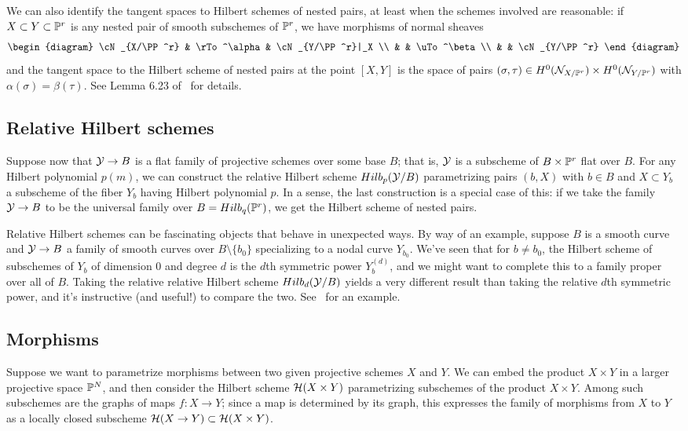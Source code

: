 We can also identify the tangent spaces to Hilbert schemes of nested pairs, at least when the schemes involved are reasonable: if $X \subset Y \subset {\mathbb P}^r$ is any nested pair of smooth subschemes of ${\mathbb P}^r$, we have morphisms of normal sheaves
$$
\begin{diagram}
\cN_{X/\PP^r} & \rTo^\alpha & \cN_{Y/\PP^r}|_X \\
& & \uTo^\beta \\
& & \cN_{Y/\PP^r}
\end{diagram}
$$
and the tangent space to the Hilbert scheme of nested pairs at the point $[X,Y]$ is the space of pairs $(\sigma, \tau) \in H^0({\mathcal N}_{X/{\mathbb P}^r}) \times H^0({\mathcal N}_{Y/{\mathbb P}^r})$ with $\alpha(\sigma) = \beta(\tau)$. See Lemma 6.23 of~\cite{3264} for details.

\subsection{Relative Hilbert schemes}\label{Relative Hilbert schemes} Suppose now that ${\mathcal Y} \to B$ is a flat family of projective schemes over some base $B$; that is, ${\mathcal Y}$ is a subscheme of $B \times {\mathbb P}^r$ flat over $B$. For any Hilbert polynomial $p(m)$, we can construct the relative Hilbert scheme $Hilb_p({\mathcal Y}/B)$ parametrizing pairs $(b, X)$ with $b \in B$ and $X \subset Y_b$ a subscheme of the fiber $Y_b$ having Hilbert polynomial $p$. In a sense, the last construction is a special case of this: if we take the family ${\mathcal Y} \to B$ to be the universal family over $B = Hilb_q({\mathbb P}^r)$, we get the Hilbert scheme of nested pairs.

Relative Hilbert schemes can be fascinating objects that behave in unexpected ways. By way of an example, suppose $B$ is a smooth curve and ${\mathcal Y} \to B$ a family of smooth curves over $B \setminus \{b_0\}$ specializing to a nodal curve $Y_{b_0}$. We've seen that for $b \neq b_0$, the Hilbert scheme of subschemes of $Y_b$ of dimension 0 and degree $d$ is the $d$th symmetric power $Y_b^{(d)}$, and we might want to complete this to a family proper over all of $B$. Taking the relative relative Hilbert scheme $Hilb_d({\mathcal Y}/B)$ yields a very different result than taking the relative $d$th symmetric power, and it's instructive (and useful!) to compare the two. See~\cite{MR2172162} for an example.


\subsection{Morphisms}\label{Hilbert morphisms} Suppose we want to parametrize morphisms between two given projective schemes $X$ and $Y$. We can embed the product $X \times Y$ in a larger projective space ${\mathbb P}^N$, and then consider the Hilbert scheme $\mathcal H(X \times Y)$ parametrizing subschemes of the product $X \times Y$. Among such subschemes are the graphs of maps $f: X \to Y$; since a map is determined by its graph, this expresses the family of morphisms from $X$ to $Y$ as a locally closed subscheme $\mathcal H(X \to Y) \subset \mathcal H(X \times Y)$.

